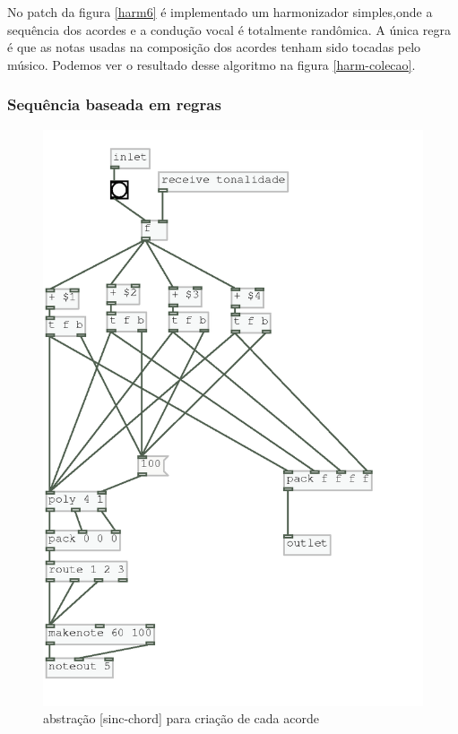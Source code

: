 \documentclass[draft]{ppgmus}
\begin{document}
No patch da figura \ref{harm6} é implementado um harmonizador simples,onde a sequência dos acordes e
a condução vocal é totalmente randômica. A única regra é que as notas usadas na composição
dos acordes tenham sido tocadas pelo músico. Podemos ver o resultado desse algoritmo na figura \ref{harm-colecao}.

\subsubsection{Sequência baseada em regras}


\begin{figure}
\includegraphics[scale=.6]{sinc-chord}
\caption{abstração [sinc-chord] para criação de cada acorde }
\label{sinc-chord}
\end{figure}
\end{document}
